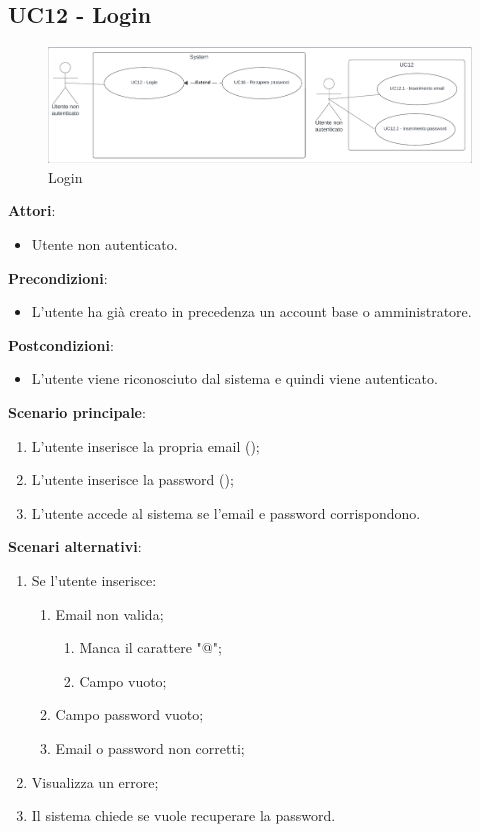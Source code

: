 \subsection{UC12 - Login} \label{usecase:12}
\begin{figure}[H]
    \centering
    \includegraphics[width=0.9\linewidth]{ucd/ucd12.png}
    \caption{Login}
\end{figure}
\textbf{Attori}:
\begin{itemize}
    \item Utente non autenticato.
\end{itemize}
\textbf{Precondizioni}:
\begin{itemize}
    \item L'utente ha già creato in precedenza un account base o amministratore.
\end{itemize}
\textbf{Postcondizioni}:
\begin{itemize}
    \item L'utente viene riconosciuto dal sistema e quindi viene autenticato.
\end{itemize}
\textbf{Scenario principale}:
\begin{enumerate}
    \item L'utente inserisce la propria email ();
    \item L'utente inserisce la password ();
    \item L'utente accede al sistema se l'email e password corrispondono.
\end{enumerate}
\textbf{Scenari alternativi}:
\begin{enumerate}
    \item Se l'utente inserisce:
    \begin{enumerate}
        \item Email non valida;
        \begin{enumerate}
            \item Manca il carattere "@";
            \item Campo vuoto;
        \end{enumerate}
        \item Campo password vuoto;
        \item Email o password non corretti;
    \end{enumerate}
    \item Visualizza un errore;
    \item Il sistema chiede se vuole recuperare la password.
\end{enumerate}